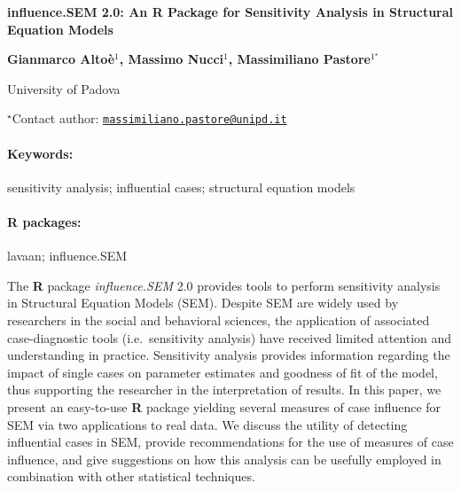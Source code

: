 \documentclass[11pt, a4paper]{article}
\renewcommand{\title}[1]{\begin{center}{\bf \LARGE #1}\end{center}}
\newcommand{\keywords}{\paragraph{Keywords:}}
\newcommand{\packages}{\paragraph{R packages:}}
\begin{document}
\pagestyle{empty}

\title{influence.SEM 2.0: An R Package for Sensitivity Analysis in Structural
Equation Models}

\begin{center}
  {\bf Gianmarco Altoè$^{1}$, Massimo Nucci$^{1}$, Massimiliano Pastore$^{1^\star}$}
\end{center}

\vskip 0.3cm

\begin{affiliations}
\begin{enumerate}
\begin{minipage}{0.915\textwidth}
\centering
\item University of Padova \\[-2pt]
\end{minipage}
\end{enumerate}
$^\star$Contact author: \href{mailto:massimiliano.pastore@unipd.it}{\nolinkurl{massimiliano.pastore@unipd.it}}\\
\end{affiliations}

\vskip 0.5cm

\begin{minipage}{0.915\textwidth}
\keywords sensitivity analysis; influential cases; structural equation models
\packages lavaan; influence.SEM
\end{minipage}

\vskip 0.8cm

The \textbf{R} package \emph{influence.SEM} 2.0 provides tools to
perform sensitivity analysis in Structural Equation Models (SEM).
Despite SEM are widely used by researchers in the social and behavioral
sciences, the application of associated case-diagnostic tools
(i.e.~sensitivity analysis) have received limited attention and
understanding in practice. Sensitivity analysis provides information
regarding the impact of single cases on parameter estimates and goodness
of fit of the model, thus supporting the researcher in the
interpretation of results. In this paper, we present an easy-to-use
\textbf{R} package yielding several measures of case influence for SEM
via two applications to real data. We discuss the utility of detecting
influential cases in SEM, provide recommendations for the use of
measures of case influence, and give suggestions on how this analysis
can be usefully employed in combination with other statistical
techniques.
\end{document}
